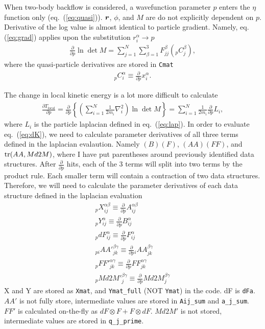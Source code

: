 When two-body backflow is considered, a wavefunction parameter $p$ enters the $\eta$ function only (eq.~(\ref{eq:quasi})). $\boldsymbol{r}$, $\phi$, and $M$ are do not explicitly dependent on $p$. Derivative of the log value is almost identical to particle gradient. Namely, eq. (\ref{eq:grad}) applies upon the substitution $r_i^\alpha\rightarrow p$
\begin{align}
\frac{\partial}{\partial p} \ln\det M = \sum\limits_{j=1}^N \sum\limits_{\beta=1}^3 F_{jj}^\beta \left({}_pC_{j}^{\beta}\right),
\end{align}
where the quasi-particle derivatives are stored in \verb|Cmat|
\begin{align}
{}_pC_{i}^{\alpha} \equiv \frac{\partial}{\partial p} x_{i}^{\alpha}.
\end{align}

The change in local kinetic energy is a lot more difficult to calculate
\begin{align}
\frac{\partial T_{\text{local}}}{\partial p} = \frac{\partial}{\partial p} \left\{ \left( \sum\limits_{i=1}^N \frac{1}{2m_i} \nabla^2_i \right) \ln \det M \right\} = \sum\limits_{i=1}^N \frac{1}{2m_i} \frac{\partial}{\partial p} L_i, \label{eq:dK}
\end{align}
where $L_i$ is the particle laplacian defined in eq.~(\ref{eq:lap}). In order to evaluate eq.~(\ref{eq:dK}), we need to calculate parameter derivatives of all three terms defined in the laplacian evalaution. Namely $(B)(F)$, $(AA)(FF)$, and $\text{tr}(AA,Md2M)$, where I have put parentheses around previously identified data structures. After $\frac{\partial}{\partial p}$ hits, each of the 3 terms will split into two terms by the product rule. Each smaller term will contain a contraction of two data structures. Therefore, we will need to calculate the parameter derivatives of each data structure defined in the laplacian evaluation
\begin{align}
{}_pX_{ij}^{\alpha\beta} \equiv \frac{\partial}{\partial p} A_{ij}^{\alpha\beta} \\
{}_pY_{ij}^{\alpha} \equiv \frac{\partial}{\partial p} B_{ij}^{\alpha} \\
{}_pdF_{ij}^{\alpha} \equiv \frac{\partial}{\partial p} F_{ij}^{\alpha} \\
{}_{pi}{AA'}_{jk}^{\beta\gamma} \equiv \frac{\partial}{\partial p}  {}_iAA_{jk}^{\beta\gamma} \\
{}_p {FF'}_{jk}^{\alpha\gamma} \equiv \frac{\partial}{\partial p} FF_{jk}^{\alpha\gamma} \\
{}_p {Md2M'}_{j}^{\beta\gamma} \equiv \frac{\partial}{\partial p} Md2M_j^{\beta\gamma}
\end{align}
X and Y are stored as \verb|Xmat|, and \verb|Ymat_full| (NOT \verb|Ymat|) in the code. dF is \verb|dFa|. $AA'$ is not fully store, intermediate values are stored in \verb|Aij_sum| and \verb|a_j_sum|. $FF'$ is calculated on-the-fly as $dF\otimes F+F\otimes dF$. $Md2M'$ is not stored, intermediate values are stored in \verb|q_j_prime|.
